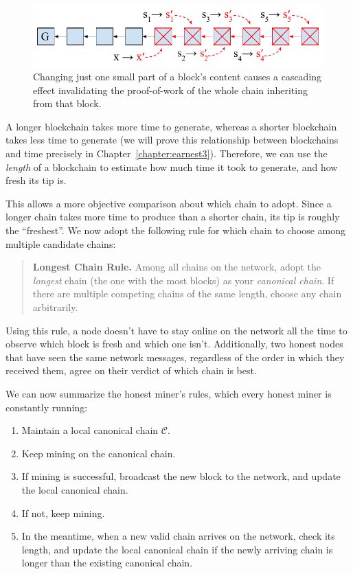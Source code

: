 \begin{figure}[h]
    \centering
    \includegraphics[width=0.7 \columnwidth,keepaspectratio]{figures/blockchain-invalidation.pdf}
    \caption{Changing just one small part of a block's content causes a cascading effect invalidating the proof-of-work of the whole chain inheriting from that block.}
    \label{fig.blockchain-invalidation}
\end{figure}

A longer blockchain takes more time to generate, whereas a shorter blockchain takes less time
to generate (we will prove this relationship between blockchains and time precisely in
Chapter~\ref{chapter:earnest3}). Therefore, we can use the \emph{length} of a blockchain
to estimate how much time it took to generate, and how fresh its tip is.

This allows a more objective comparison about which chain to adopt. Since a longer chain takes
more time to produce than a shorter chain, its tip is roughly the ``freshest''.
We now adopt the following rule for which chain to choose among multiple candidate
chains:

\begin{quote}
    \textbf{Longest Chain Rule. }
    Among all chains on the network, adopt the \emph{longest} chain (the one with the most
    blocks) as your \emph{canonical chain}. If there are multiple
    competing chains of the same length, choose any chain arbitrarily.
\end{quote}

Using this rule, a node doesn't have to stay online on the network all the time to observe
which block is fresh and which one isn't. Additionally, two honest nodes that have seen the
same network messages, regardless of the order in which they received them, agree on their
verdict of which chain is best.

We can now summarize the honest miner's rules, which every honest miner is constantly running:

\begin{enumerate}
  \item Maintain a local canonical chain $\mathcal{C}$.
  \item Keep mining on the canonical chain.
  \item If mining is successful, broadcast the new block to the network, and update the local canonical chain.
  \item If not, keep mining.
  \item In the meantime, when a new valid chain arrives on the network,
        check its length, and update the local canonical chain if the
        newly arriving chain is longer than the existing canonical chain.
\end{enumerate}


